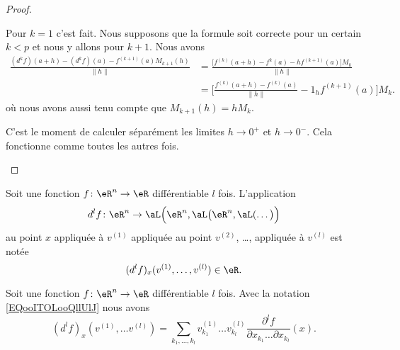 \begin{proof}
\begin{subproof}
		Pour \( k=1\) c'est fait. Nous supposons que la formule soit correcte pour un certain \( k< p\) et nous y allons pour \( k+1\). Nous avons
		\begin{subequations}        \label{SUBEQSooUPLAooQhueCl}
			\begin{align}
				\frac{ (d^kf)(a+h)-(d^kf)(a)-f^{(k+1)}(a)M_{k+1}(h) }{ \| h \| } & =\frac{ \big[ f^{(k)}(a+h)-f^k(a)-hf^{(k+1)}(a) \big]M_k  }{ \| h \| }       \\
				                                                                 & =\big[ \frac{ f^{(k)}(a+h)-f^{(k)}(a) }{ \| h \| }-1_hf^{(k+1)}(a) \big]M_k.
			\end{align}
		\end{subequations}
		où nous avons aussi tenu compte que \( M_{k+1}(h)=hM_k\).

		C'est le moment de calculer séparément les limites \( h\to 0^+\) et \( h\to 0^-\). Cela fonctionne comme toutes les autres fois.
	\end{subproof}
\end{proof}

Soit une fonction \( f\colon \eR^n\to \eR\) différentiable \( l\) fois. L'application
\begin{equation}
	d^lf\colon \eR^n\to \aL\Big( \eR^n,\aL\big( \eR^n,\aL(\ldots \big) \Big)
\end{equation}
au point \( x\) appliquée à \( v^{(1)}\) appliquée au point \( v^{(2)}\), \ldots, appliquée à \( v^{(l)}\) est notée
\begin{equation}        \label{EQooITOLooQllUlJ}
	(d^lf)_x(v^{(1)},\ldots ,v^{(l)})\in \eR.
\end{equation}

\begin{proposition}     \label{PROPooQKZIooXTvkIr}
	Soit une fonction \( f\colon \eR^n\to \eR\) différentiable \( l\) fois. Avec la notation \eqref{EQooITOLooQllUlJ} nous avons
	\begin{equation}
		(d^lf)_x(v^{(1)},\ldots v^{(l)})=\sum_{k_1,\ldots, k_l}v^{(1)}_{k_1}\ldots v_{k_l}^{(l)}\frac{ \partial^lf }{ \partial x_{k_1}\ldots \partial x_{k_l} }(x).
	\end{equation}
\end{proposition}

